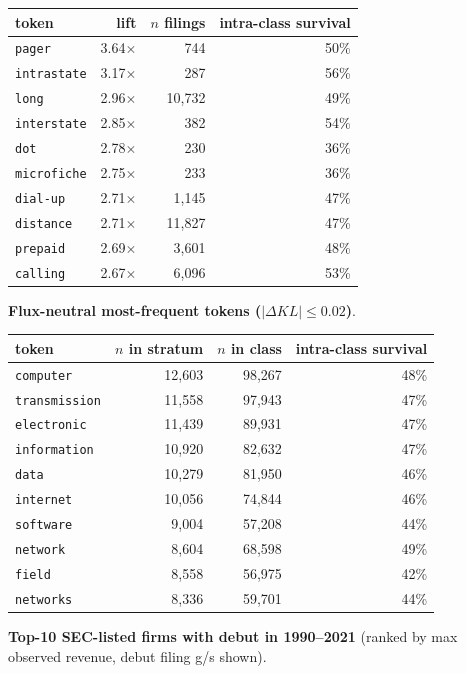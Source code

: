 \begin{tabular}{lrrr}
\toprule
token & lift & $n$ filings & intra-class survival \\
\midrule
\texttt{pager} & 3.64$\times$ & 744 & 50\% \\
\texttt{intrastate} & 3.17$\times$ & 287 & 56\% \\
\texttt{long} & 2.96$\times$ & 10,732 & 49\% \\
\texttt{interstate} & 2.85$\times$ & 382 & 54\% \\
\texttt{dot} & 2.78$\times$ & 230 & 36\% \\
\texttt{microfiche} & 2.75$\times$ & 233 & 36\% \\
\texttt{dial-up} & 2.71$\times$ & 1,145 & 47\% \\
\texttt{distance} & 2.71$\times$ & 11,827 & 47\% \\
\texttt{prepaid} & 2.69$\times$ & 3,601 & 48\% \\
\texttt{calling} & 2.67$\times$ & 6,096 & 53\% \\
\bottomrule
\end{tabular}

\textbf{Flux-neutral most-frequent tokens ($|\Delta KL|\leq 0.02$)}.

\begin{tabular}{lrrr}
\toprule
token & $n$ in stratum & $n$ in class & intra-class survival \\
\midrule
\texttt{computer} & 12,603 & 98,267 & 48\% \\
\texttt{transmission} & 11,558 & 97,943 & 47\% \\
\texttt{electronic} & 11,439 & 89,931 & 47\% \\
\texttt{information} & 10,920 & 82,632 & 47\% \\
\texttt{data} & 10,279 & 81,950 & 46\% \\
\texttt{internet} & 10,056 & 74,844 & 46\% \\
\texttt{software} & 9,004 & 57,208 & 44\% \\
\texttt{network} & 8,604 & 68,598 & 49\% \\
\texttt{field} & 8,558 & 56,975 & 42\% \\
\texttt{networks} & 8,336 & 59,701 & 44\% \\
\bottomrule
\end{tabular}

\textbf{Top-10 SEC-listed firms with debut in 1990--2021} (ranked by max observed revenue, debut filing g/s shown).

